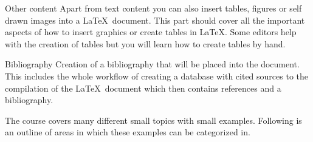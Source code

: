 \documentclass[10pt, a4paper]{beamer} %
\begin{document}
    \begin{frame}{Other content}
    Apart from text content you can also insert tables, figures or self drawn images into a \LaTeX\ document. This part should cover all the important aspects of how to insert graphics or create tables in \LaTeX. Some editors help with the creation of tables but you will learn how to create tables by hand.
    \end{frame}

    
    \begin{frame}{Bibliography}
    Creation of a bibliography that will be placed into the document. This includes the whole workflow of creating a database with cited sources to the compilation of the \LaTeX\ document which then contains references and a bibliography.

    The course covers many different small topics with small examples. Following is an outline of areas in which these examples can be categorized in.
    \end{frame}





    
\end{document}
